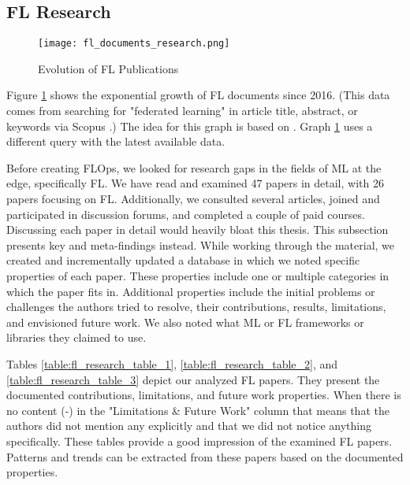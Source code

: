 
\subsection{FL Research}\label{subsection:fl_research}

\begin{figure}[h]
    \centering
    \texttt{[image: fl\_documents\_research.png]}
    \caption{Evolution of FL Publications}
    \label{fig:fl_documents_research}
\end{figure}

Figure \ref{fig:fl_documents_research} shows the exponential growth of FL documents since 2016.
(This data comes from searching for "federated learning" in article title, abstract, or keywords via Scopus \cite{scopus_homepage}.)
The idea for this graph is based on \cite{thesis:tum_fl_framework_comparison}.
Graph \ref{fig:fl_documents_research} uses a different query with the latest available data.

Before creating FLOps, we looked for research gaps in the fields of ML at the edge, specifically FL.
We have read and examined 47 papers in detail, with 26 papers focusing on FL. 
Additionally, we consulted several articles, joined and participated in discussion forums, and completed a couple of paid courses.
Discussing each paper in detail would heavily bloat this thesis.
This subsection presents key and meta-findings instead.
While working through the material, we created and incrementally updated a database in which we noted specific properties of each paper.
These properties include one or multiple categories in which the paper fits in.
Additional properties include the initial problems or challenges the authors tried to resolve, their contributions, results, limitations, and envisioned future work.
We also noted what ML or FL frameworks or libraries they claimed to use.

\begin{figure}[p]
    
\end{figure}

\begin{figure}[p]
    
\end{figure}

\begin{figure}[p]
    
\end{figure}

Tables \ref{table:fl_research_table_1}, \ref{table:fl_research_table_2}, and \ref{table:fl_research_table_3} depict our analyzed FL papers.
They present the documented contributions, limitations, and future work properties.
When there is no content (-) in the "Limitations \& Future Work" column that means that the authors did not mention any explicitly and that we did not notice anything specifically.
These tables provide a good impression of the examined FL papers.
Patterns and trends can be extracted from these papers based on the documented properties.

